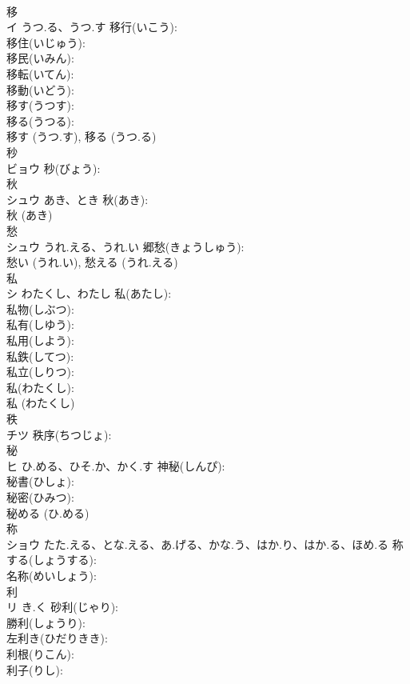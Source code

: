 \documentclass[8pt]{extreport}
\begin{document}
\begin{CJK}{UTF8}{min}
\\	移			
\\	イ	うつ.る、うつ.す	移行(いこう): 
\\	移住(いじゅう): 
\\	移民(いみん): 
\\	移転(いてん): 
\\	移動(いどう): 
\\	移す(うつす): 
\\	移る(うつる): 
\\	移す (うつ.す), 移る (うつ.る)
\\	秒			
\\	ビョウ		秒(びょう): 
\\	秋			
\\	シュウ	あき、とき	秋(あき): 
\\	秋 (あき)
\\	愁			
\\	シュウ	うれ.える、うれ.い	郷愁(きょうしゅう): 
\\	愁い (うれ.い), 愁える (うれ.える)
\\	私			
\\	シ	わたくし、わたし	私(あたし): 
\\	私物(しぶつ): 
\\	私有(しゆう): 
\\	私用(しよう): 
\\	私鉄(してつ): 
\\	私立(しりつ): 
\\	私(わたくし): 
\\	私 (わたくし)
\\	秩			
\\	チツ		秩序(ちつじょ): 
\\	秘			
\\	ヒ	ひ.める、ひそ.か、かく.す	神秘(しんぴ): 
\\	秘書(ひしょ): 
\\	秘密(ひみつ): 
\\	秘める (ひ.める)
\\	称			
\\	ショウ	たた.える、とな.える、あ.げる、かな.う、はか.り、はか.る、ほめ.る	称する(しょうする): 
\\	名称(めいしょう): 
\\	利			
\\	リ	き.く	砂利(じゃり): 
\\	勝利(しょうり): 
\\	左利き(ひだりきき): 
\\	利根(りこん): 
\\	利子(りし): 

\end{CJK}
\end{document}
